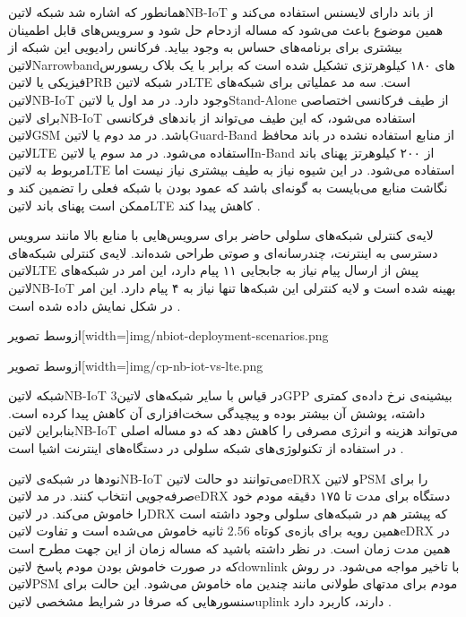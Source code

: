 
همانطور که اشاره شد شبکه ‌لاتین{NB-IoT} از باند دارای لایسنس استفاده می‌کند و همین موضوع باعث می‌شود که مساله ازدحام حل شود و سرویس‌های
قابل اطمینان بیشتری برای برنامه‌های حساس به وجود بیاید.
فرکانس رادیویی این شبکه از ‌لاتین{Narrowband}های ۱۸۰ کیلوهرتزی تشکیل شده است که برابر با یک بلاک ریسورس فیزیکی یا ‌لاتین{PRB} در شبکه ‌لاتین{LTE} است.
سه مد عملیاتی برای شبکه‌های ‌لاتین{NB-IoT} وجود دارد.
در مد اول یا ‌لاتین{Stand-Alone} از طیف فرکانسی اختصاصی برای ‌لاتین{NB-IoT} استفاده می‌شود، که این طیف می‌تواند از باندهای فرکانسی ‌لاتین{GSM} باشد.
در مد دوم یا ‌لاتین{Guard-Band} از منابع استفاده نشده در باند محافظ ‌لاتین{LTE} استفاده می‌شود.
در مد سوم یا ‌لاتین{In-Band} از ۲۰۰ کیلوهرتز پهنای باند مربوط به ‌لاتین{LTE} استفاده می‌شود. در این شیوه نیاز به طیف بیشتری نیاز نیست اما نگاشت منابع می‌بایست به گونه‌ای باشد
که عمود بودن با شبکه فعلی را تضمین کند و ممکن است پهنای باند ‌لاتین{LTE} کاهش پیدا کند
.

لایه‌ی کنترلی شبکه‌های سلولی حاضر برای سرویس‌هایی با منابع بالا مانند سرویس دسترسی به اینترنت، چندرسانه‌ای و صوتی
طراحی شده‌اند.
لایه‌ی کنترلی شبکه‌های ‌لاتین{LTE} پیش از ارسال پیام نیاز به جابجایی ۱۱ پیام دارد، این امر در شبکه‌های ‌لاتین{NB-IoT}
بهینه شده است و لایه کنترلی این شبکه‌ها تنها نیاز به ۴ پیام دارد. این امر در شکل 
نمایش داده شده است
.

‌ازوسط
‌تصویر[width=\textwidth]{img/nbiot-deployment-scenarios.png}

‌ازوسط
‌تصویر[width=\textwidth]{img/cp-nb-iot-vs-lte.png}

شبکه ‌لاتین{NB-IoT} در قیاس با سایر شبکه‌های ‌لاتین{3GPP} بیشینه‌ی نرخ داده‌ی کمتری داشته،
پوشش آن بیشتر بوده و پیچیدگی سخت‌افزاری آن کاهش پیدا کرده است.
بنابراین ‌لاتین{NB-IoT} می‌تواند هزینه و انرژی مصرفی را کاهش دهد که دو مساله اصلی در استفاده از تکنولوژی‌های
شبکه سلولی در دستگاه‌های اینترنت اشیا است
.

نودها در شبکه‌ی ‌لاتین{NB-IoT} می‌توانند دو حالت ‌لاتین{eDRX} و ‌لاتین{PSM} را برای صرفه‌جویی انتخاب کنند.
در مد ‌لاتین{eDRX} دستگاه برای مدت تا ۱۷۵ دقیقه مودم خود را خاموش می‌کند.
در ‌لاتین{DRX} که پیشتر هم در شبکه‌های سلولی وجود داشته است همین رویه برای بازه‌ی کوتاه $2.56$ ثانیه خاموش می‌شده است
و تفاوت ‌لاتین{eDRX} در همین مدت زمان است.
در نظر داشته باشید که مساله زمان از این جهت مطرح است که در صورت خاموش بودن مودم پاسخ ‌لاتین{downlink} با تاخیر مواجه می‌شود.
در روش ‌لاتین{PSM} مودم برای مدتهای طولانی مانند چندین ماه خاموش می‌شود.
این حالت برای سنسورهایی که صرفا در شرایط مشخصی ‌لاتین{uplink} دارند، کاربرد دارد
.

